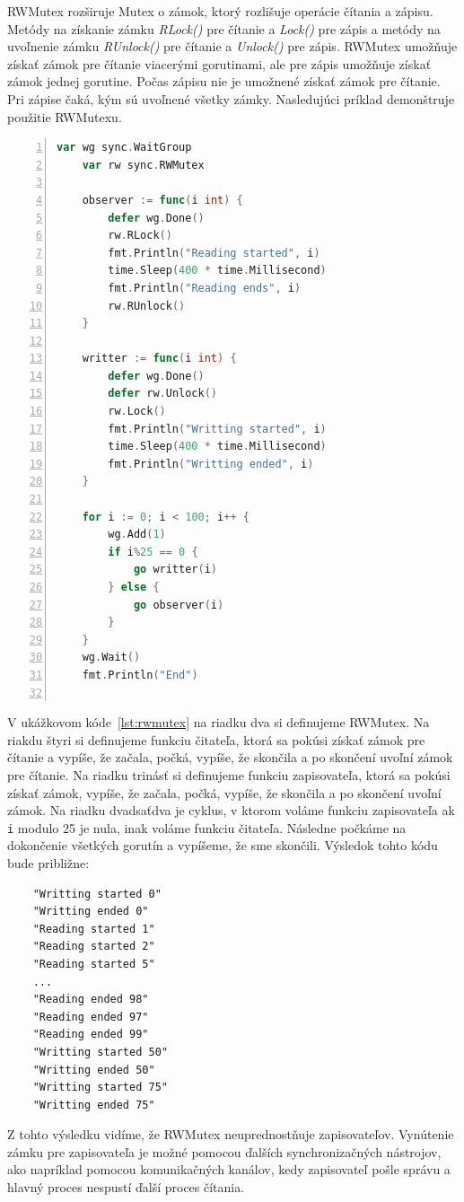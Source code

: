 \documentclass[
  biblatex,
  seconds=true,
  language=slovak,
  figures=false,
  urldate=iso,
  glossaries,
  index
]{kidiplom}
\begin{document}
RWMutex rozširuje Mutex o zámok, ktorý rozlišuje operácie čítania a zápisu. Metódy na získanie zámku \emph{RLock()} pre čítanie a \emph{Lock()} pre zápis a
metódy na uvoľnenie zámku \emph{RUnlock()} pre čítanie a \emph{Unlock()} pre zápis. RWMutex umožňuje získať zámok pre čítanie viacerými gorutinami,
ale pre zápis umožňuje získať zámok jednej gorutine. Počas zápisu nie je umožnené získať zámok pre čítanie. Pri zápise čaká, kým sú uvoľnené
všetky zámky. Nasledujúci príklad demonštruje použitie RWMutexu.
\newpage
\begin{lstlisting}[language=Go, numbers=left, caption={Použitie RWMutex}, captionpos=b, label={lst:rwmutex}]
    var wg sync.WaitGroup
	var rw sync.RWMutex

	observer := func(i int) {
		defer wg.Done()
		rw.RLock()
		fmt.Println("Reading started", i)
		time.Sleep(400 * time.Millisecond)
		fmt.Println("Reading ends", i)
		rw.RUnlock()
	}

	writter := func(i int) {
		defer wg.Done()
		defer rw.Unlock()
		rw.Lock()
		fmt.Println("Writting started", i)
		time.Sleep(400 * time.Millisecond)
		fmt.Println("Writting ended", i)
	}

	for i := 0; i < 100; i++ {
		wg.Add(1)
		if i%25 == 0 {
			go writter(i)
		} else {
			go observer(i)
		}
	}
	wg.Wait()
	fmt.Println("End")
    
\end{lstlisting}
V ukážkovom kóde~\ref{lst:rwmutex} na riadku dva si definujeme RWMutex. Na riakdu štyri si definujeme funkciu čitateľa, ktorá sa pokúsi získať zámok pre čítanie a
vypíše, že začala, počká, vypíše, že skončila a po skončení uvoľní zámok pre čítanie.
Na riadku trinásť si definujeme funkciu zapisovateľa, ktorá sa pokúsi získať zámok, vypíše, že začala, počká, vypíše, že skončila
a po skončení uvoľní zámok.
Na riadku dvadsaťdva je cyklus, v ktorom voláme funkciu zapisovateľa ak \texttt{i} modulo 25 je nula, inak voláme funkciu čitateľa.
Následne počkáme na dokončenie všetkých gorutín a vypíšeme, že sme skončili. Výsledok tohto kódu bude približne:
\newpage
\begin{lstlisting}
    "Writting started 0"
    "Writting ended 0"
    "Reading started 1"
    "Reading started 2"
    "Reading started 5"
    ...
    "Reading ended 98"
    "Reading ended 97"
    "Reading ended 99"
    "Writting started 50"
    "Writting ended 50"
    "Writting started 75"
    "Writting ended 75"
\end{lstlisting}
Z tohto výsledku vidíme, že RWMutex neuprednostňuje zapisovateľov. Vynútenie zámku pre zapisovateľa je možné pomocou ďalších
synchronizačných nástrojov, ako napríklad pomocou komunikačných kanálov, kedy zapisovateľ pošle správu a hlavný proces nespustí ďalší proces čítania.
\end{document}

